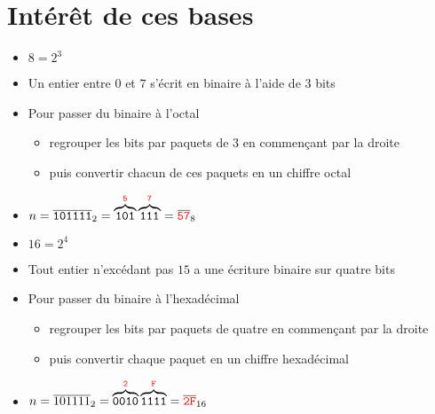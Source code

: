 \section{Intérêt de ces bases}


\begin{frame}



 \begin{itemize}
   \pause
   \item $8 = 2^3$
     \pause
   \item Un entier entre $0$ et $7$ s'écrit en binaire à l'aide de $3$ bits
     \pause
   \item Pour passer du binaire à l'octal
     \begin{itemize}
       \pause
     \item regrouper les bits par paquets de $3$ en commençant par la droite
       \pause
     \item puis  convertir chacun de ces paquets en un chiffre octal
     \end{itemize}
     \pause
  \item $n = \overline{\mathtt{101111}}_2 =  \overbrace{\mathtt{101}}^{\textcolor{red}{\mathtt{5}}}\overbrace{\mathtt{111}}^{\textcolor{red}{\mathtt{7}}} = \overline{\textcolor{red}{\mathtt{57}}}_8$
 \end{itemize}



\end{frame}

\begin{frame}

 \begin{itemize}
   \pause
   \item $16 = 2^4$
     \pause
   \item Tout entier n’excédant pas $15$ a une écriture
binaire sur quatre bits
   \pause
   \item Pour passer du binaire à l'hexadécimal
     \begin{itemize}
       \pause
     \item  regrouper les bits par paquets de quatre en commençant par la droite
       \pause
     \item puis convertir chaque paquet en un chiffre hexadécimal
     \end{itemize}
     \pause
  \item $n = \overline{101111}_{2}= \overbrace{\mathtt{0010}}^{\textcolor{red}{\mathtt{2}}}\overbrace{\mathtt{1111}}^{\textcolor{red}{\mathtt{F}}} = \overline{\textcolor{red}{\mathtt{2F}}}_{16}$

   
 \end{itemize}

\end{frame}


